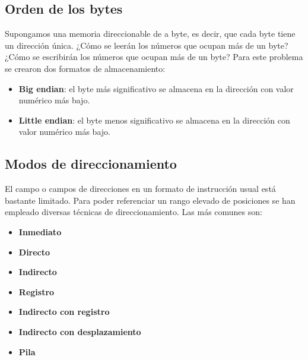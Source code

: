 \subsection{Orden de los bytes}

Supongamos una memoria direccionable de a byte, es decir, que cada byte tiene un dirección única. ¿Cómo se leerán los números que ocupan más de un byte? ¿Cómo se escribirán los números que ocupan más de un byte? 
Para este problema se crearon dos formatos de almacenamiento:

\begin{itemize}
  \item \textbf{Big endian}: el byte más significativo se almacena en la dirección con valor numérico más bajo.
  \item \textbf{Little endian}: el byte menos significativo se almacena en la dirección con valor numérico más bajo.
\end{itemize}

\begin{figure}[H]
  \hspace*{\fill}
  \hfill
  \hspace*{\fill}
\end{figure}

\subsection{Modos de direccionamiento}

El campo o campos de direcciones en un formato de instrucción usual está bastante limitado. Para poder referenciar un rango elevado de posiciones se han empleado diversas técnicas de direccionamiento. Las más comunes son:

\begin{itemize}
  \item \textbf{Inmediato}
  \item \textbf{Directo}
  \item \textbf{Indirecto}
  \item \textbf{Registro}
  \item \textbf{Indirecto con registro}
  \item \textbf{Indirecto con desplazamiento}
  \item \textbf{Pila}
\end{itemize}

